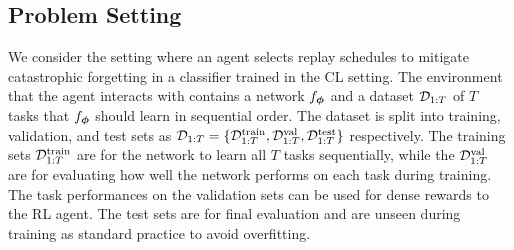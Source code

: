


  
\subsection{Problem Setting}

We consider the setting where an agent selects replay schedules to mitigate catastrophic forgetting in a classifier trained in the CL setting. The environment that the agent interacts with contains a network $f_{{\bm{\phi}}}$ and a dataset ${\mathcal{D}}_{1:T}$ of $T$ tasks that $f_{{\bm{\phi}}}$ should learn in sequential order. The dataset is split into training, validation, and test sets as ${\mathcal{D}}_{1:T} = \{{\mathcal{D}}_{1:T}^{{\text{train}}}, {\mathcal{D}}_{1:T}^{{\text{val}}}, {\mathcal{D}}_{1:T}^{{\text{test}}}\}$ respectively. The training sets ${\mathcal{D}}_{1:T}^{{\text{train}}}$ are for the network to learn all $T$ tasks sequentially, while the ${\mathcal{D}}_{1:T}^{{\text{val}}}$ are for evaluating how well the network performs on each task during training. The task performances on the validation sets can be used for dense rewards to the RL agent. The test sets are for final evaluation and are unseen during training as standard practice to avoid overfitting.  


